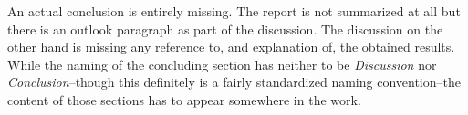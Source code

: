 \documentclass[../review.tex]{subfiles}
\begin{document}
An actual conclusion is entirely missing. The report is not summarized at all but there is an outlook paragraph as part of the discussion. The discussion on the other hand is missing any reference to, and explanation of, the obtained results. While the naming of the concluding section has neither to be \textit{Discussion} nor \textit{Conclusion}--though this definitely is a fairly standardized naming convention--the content of those sections has to appear somewhere in the work.
\end{document}

